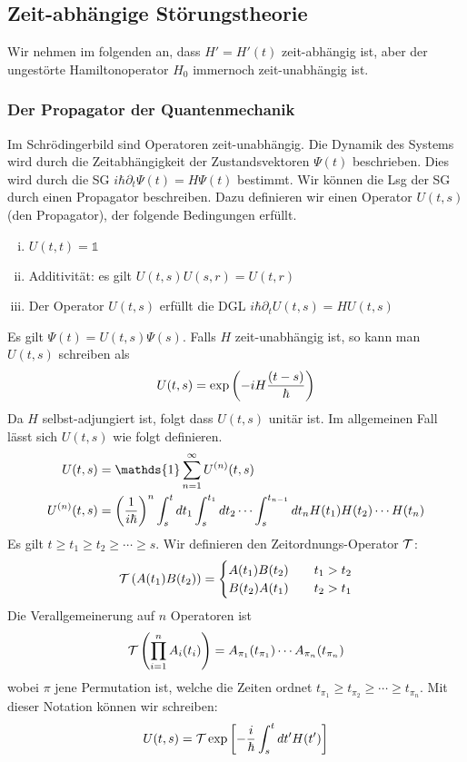 \subsection{Zeit-abhängige Störungstheorie}
Wir nehmen im folgenden an, dass $H' = H'(t)$ zeit-abhängig ist, aber der
ungestörte Hamiltonoperator $H_0$ immernoch zeit-unabhängig ist.

\subsubsection{Der Propagator der Quantenmechanik}

Im Schrödingerbild sind Operatoren zeit-unabhängig. Die Dynamik des Systems
wird durch die Zeitabhängigkeit der Zustandsvektoren $\Psi(t)$ beschrieben.
Dies wird durch die SG $i \hbar \partial_t \Psi(t) = H \Psi(t)$ bestimmt. Wir
können die Lsg der SG durch einen Propagator beschreiben. Dazu definieren wir
einen Operator $U(t,s)$ (den Propagator), der folgende Bedingungen erfüllt.
\begin{enumerate}[(i)]
    \item $U(t,t) = \mathds{1}$
    \item Additivität: es gilt $U(t,s) U(s,r) = U(t,r)$
    \item Der Operator $U(t,s)$ erfüllt die DGL $i \hbar \partial_t U(t,s) = H U(t,s)$
\end{enumerate}
Es gilt $\Psi(t) = U(t,s) \Psi(s)$. Falls $H$ zeit-unabhängig ist, so kann man
$U(t,s)$ schreiben als
\begin{align*}
    U(t,s) = \exp \left( -i H \frac{(t-s)}{\hbar} \right)
\end{align*}
Da $H$ selbst-adjungiert ist, folgt dass $U(t,s)$ unitär ist. Im allgemeinen
Fall lässt sich $U(t,s)$ wie folgt definieren.
\begin{align*}
    U(t,s) &= \mathds{1} \sum_{n=1}^\infty U^{(n)}(t,s)
    \\
    U^{(n)} (t,s) &= \klammer{\frac{1}{i \hbar}}^n \int_s^t dt_1
        \int_s^{t_1} dt_2 \dotsb \int_{s}^{t_{n-1}} dt_n
        H(t_1) H(t_2) \dotsb H(t_n)
\end{align*}
Es gilt $t \geq t_1 \geq t_2 \geq \dotsb \geq s$. Wir definieren den
Zeitordnungs-Operator $\mathcal{T}$:
\begin{align*}
    \mathcal{T} \left( A(t_1) B(t_2) \right) = \begin{cases}
        A(t_1) B(t_2) \hspace{10pt} &t_1 > t_2
        \\
        B(t_2) A(t_1) \hspace{10pt} &t_2 > t_1
    \end{cases}
\end{align*}
Die Verallgemeinerung auf $n$ Operatoren ist
\begin{align*}
    \mathcal{T} \left( \prod_{i=1}^n A_i (t_i) \right) = A_{\pi_1} (t_{\pi_1}) \dotsb A_{\pi_n} (t_{\pi_n})
\end{align*}
wobei $\pi$ jene Permutation ist, welche die Zeiten ordnet $t_{\pi_1} \geq t_{\pi_2}
\geq \dotsb \geq t_{\pi_n}$.
Mit dieser Notation können wir schreiben:
\begin{align*}
    U(t,s) = \mathcal{T} \exp \left[ - \frac{i}{\hbar} \int_s^t dt' H(t') \right]
\end{align*}


